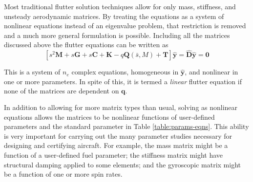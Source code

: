 \documentclass[10pt,openany,twoside]{book}
\numberwithin{equation}{section}   %
\newcommand{\Matrix}[1]{\boldsymbol{#1}}
\newcommand{\Vector}[1]{\boldsymbol{#1}}
\newcommand{\Tableref}[1]{Table \ref{#1}}
\begin{document}
Most traditional flutter solution techniques allow for only mass, stiffness,
and unsteady aerodynamic matrices. By treating the equations as a system
of nonlinear equations instead of an eigenvalue problem, that restriction
is removed and a much more general formulation is possible.
Including all the matrices discussed above the flutter equations can
be written as
\begin{equation}\label{eqn:flut}
	\left[ s^2 \Matrix{M} + s \Matrix{G} + s \Matrix{C} +
		 \Matrix{K} - q \Matrix{Q} (\bar{s},M)
		 + \Matrix{T} \right] \hat{\Vector{y}} =
		 	\hat{\Matrix{D}}\hat{\Vector{y}} = \Vector{0}
\end{equation}

This is a system of $n_e$ complex equations, homogeneous in $\Vector{\hat{y}}$,
and nonlinear in one or more parameters. In spite of this, it is termed
a \emph{linear} flutter equation if none of the matrices are
dependent on $\Vector{q}$.

In addition to allowing for more matrix types than usual, solving as nonlinear
equations allows the matrices to be nonlinear functions of user-defined parameters
and the standard parameter in \Tableref{table:params-eqns}.
This ability is very important for carrying out the many parameter studies
necessary for designing and certifying aircraft.
For example, the mass matrix might be a function of a user-defined fuel parameter;
the stiffness matrix might have structural damping applied to some elements;
and the gyroscopic matrix might be a function of one or more spin rates.
\end{document}
